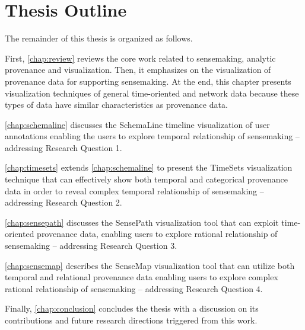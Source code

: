 \section{Thesis Outline} 
The remainder of this thesis is organized as follows.

First, \autoref{chap:review} reviews the core work related to sensemaking, analytic provenance and visualization. Then, it emphasizes on the visualization of provenance data for supporting sensemaking. At the end, this chapter presents visualization techniques of general time-oriented and network data because these types of data have similar characteristics as provenance data.

\autoref{chap:schemaline} discusses the SchemaLine timeline visualization of user annotations enabling the users to explore temporal relationship of sensemaking -- addressing Research Question 1.

\autoref{chap:timesets} extends \autoref{chap:schemaline} to present the TimeSets visualization technique that can effectively show both temporal and categorical provenance data in order to reveal complex temporal relationship of sensemaking -- addressing Research Question 2.

\autoref{chap:sensepath} discusses the SensePath visualization tool that can exploit time-oriented provenance data, enabling users to explore rational relationship of sensemaking -- addressing Research Question 3.

\autoref{chap:sensemap} describes the SenseMap visualization tool that can utilize both temporal and relational provenance data enabling users to explore complex rational relationship of sensemaking -- addressing Research Question 4.

Finally, \autoref{chap:conclusion} concludes the thesis with a discussion on its contributions and future research directions triggered from this work.